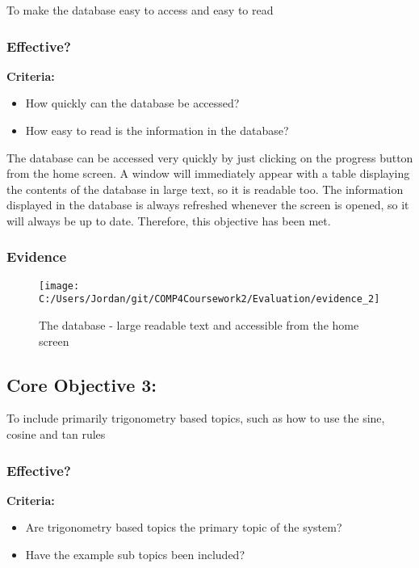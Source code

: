 To make the database easy to access and easy to read

\subsubsection{Effective?}

\textbf{Criteria: }

\begin{itemize}
	\item How quickly can the database be accessed?
	\item How easy to read is the information in the database?
\end{itemize}

The database can be accessed very quickly by just clicking on the progress button from the home screen. A window will immediately appear with a table displaying the contents of the database in large text, so it is readable too. The information displayed in the database is always refreshed whenever the screen is opened, so it will always be up to date. Therefore, this objective has been met.

\subsubsection{Evidence}

\begin{figure}[H]
	\texttt{[image: C:/Users/Jordan/git/COMP4Coursework2/Evaluation/evidence\_2]}
	\caption{The database - large readable text and accessible from the home screen}
\end{figure}

\subsection{Core Objective 3: }

To include primarily trigonometry based topics, such as how to use the sine, cosine and tan rules

\subsubsection{Effective?}

\textbf{Criteria: }

\begin{itemize}
	\item Are trigonometry based topics the primary topic of the system?
	\item Have the example sub topics been included?
\end{itemize}


